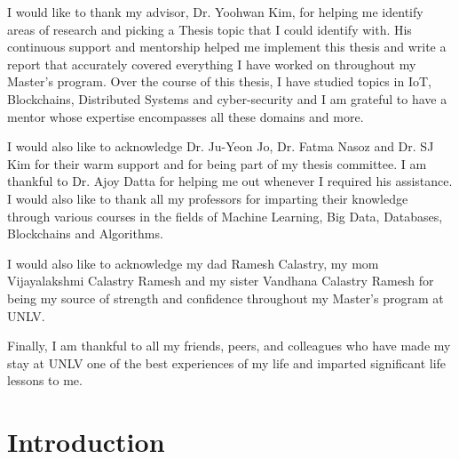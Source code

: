 \documentclass[11pt,openright]{report}
\begin{document}
\begin{thesisacknowledgments}
I would like to thank my advisor, Dr. Yoohwan Kim, for helping me identify areas of research and picking a Thesis topic that I could identify with. His continuous support and mentorship helped me implement this thesis and write a report that accurately covered everything I have worked on throughout my Master's program. Over the course of this thesis, I have studied topics in IoT, Blockchains, Distributed Systems and cyber-security and I am grateful to have a mentor whose expertise encompasses all these domains and more.

I would also like to acknowledge  Dr. Ju-Yeon Jo, Dr. Fatma Nasoz and Dr. SJ Kim for their warm support and for being part of my thesis committee. I am thankful to Dr. Ajoy Datta for helping me out whenever I required his assistance. I would also like to thank all my professors for imparting their knowledge through various courses in the fields of Machine Learning, Big Data, Databases, Blockchains and Algorithms.

I would also like to acknowledge my dad Ramesh Calastry, my mom Vijayalakshmi Calastry Ramesh and my sister Vandhana Calastry Ramesh for being my source of strength and confidence throughout my Master's program at UNLV.

Finally, I am thankful to all my friends, peers, and colleagues who have made my stay at UNLV one of the best experiences of my life and imparted significant life lessons to me. 
\end{thesisacknowledgments}

\pagestyle{plain}

\tableofcontents
\clearpage
\listoftables
\clearpage
\listoffigures
\clearpage
\listofalgorithms
\clearpage

\chapter{Introduction}\label{chapter:introduction} 
\end{document}
